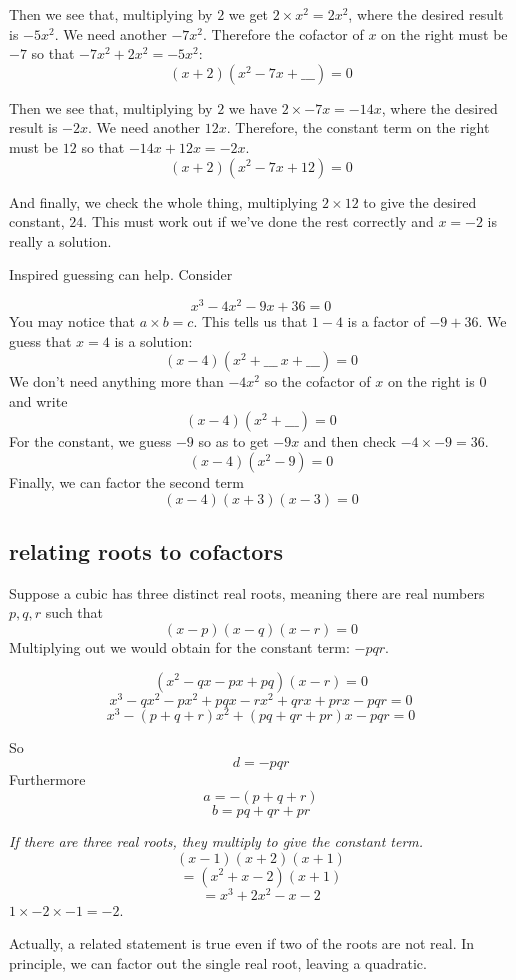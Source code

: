 \documentclass[11pt, oneside]{article}
\begin{document}
Then we see that, multiplying by $2$ we get $2 \times x^2 = 2x^2$, where the desired result is $-5x^2$.  We need another $-7x^2$.  Therefore the cofactor of $x$ on the right must be $-7$ so that $-7x^2 + 2x^2 = -5x^2$:
\[ (x + 2)(x^2 -7x + \_\_\_ ) = 0 \]

Then we see that, multiplying by $2$ we have $2 \times -7x = -14x$, where the desired result is $-2x$.  We need another $12x$.  Therefore, the constant term on the right must be $12$ so that $-14x + 12x = -2x$.
\[ (x + 2)(x^2 -7x + 12) = 0 \]

And finally, we check the whole thing, multiplying $2 \times 12$ to give the desired constant, $24$.  This must work out if we've done the rest correctly and $x = -2$ is really a solution.

Inspired guessing can help.  Consider

\[ x^3 - 4x^2 - 9x + 36 = 0 \]
You may notice that $a \times b = c$.  This tells us that $1 - 4$ is a factor of $-9 + 36$.  We guess that $x = 4$ is a solution:
\[ (x - 4) (x^2 + \_\_\_ \ x + \_\_\_ ) = 0 \]
We don't need anything more than $-4x^2$ so the cofactor of $x$ on the right is $0$ and write
\[ (x - 4) (x^2 + \_\_\_ ) = 0 \]
For the constant, we guess $-9$ so as to get $-9x$ and then check $-4 \times -9 = 36$.
\[ (x - 4) (x^2 - 9) = 0 \]
Finally, we can factor the second term
\[ (x - 4) (x + 3)(x - 3) = 0 \]

\subsection*{relating roots to cofactors}

Suppose a cubic has three distinct real roots, meaning there are real numbers $p,q,r$ such that
\[ (x - p)(x - q)(x - r) = 0 \]
Multiplying out we would obtain for the constant term:  $-pqr$.

\[ (x^2 - qx - px + pq)(x - r) = 0 \]
\[ x^3 - qx^2 - px^2 + pqx - rx^2 + qrx + prx - pqr = 0 \]
\[ x^3 - (p + q + r)x^2 + (pq + qr + pr)x - pqr = 0 \]

So
\[ d = -pqr \]
Furthermore
\[ a = - (p + q + r) \]
\[ b = pq + qr + pr \]

\emph{If there are three  real roots, they multiply to give the constant term.}
\[ (x - 1)(x + 2)(x + 1) \]
\[ = (x^2 + x - 2)(x + 1) \]
\[ = x^3 + 2x^2 - x - 2  \]
$1 \times -2 \times -1 = -2$. 

Actually, a related statement is true even if two of the roots are not real.  In principle, we can factor out the single real root, leaving a quadratic.
\end{document}
